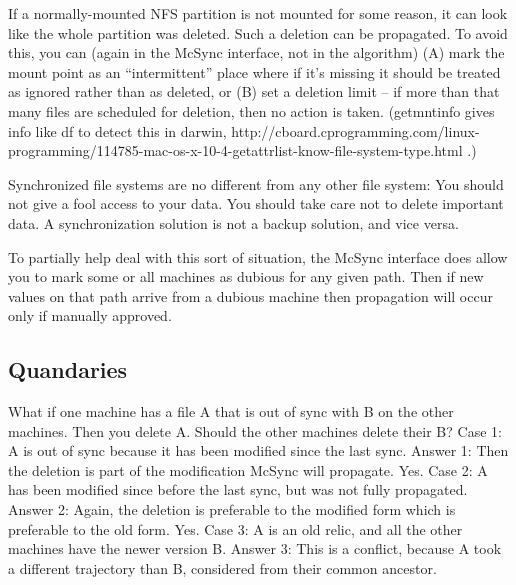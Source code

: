 \documentclass{book}
\begin{document}
If a normally-mounted NFS partition is not mounted for some reason, it can look like the whole partition was deleted.  Such a deletion can be propagated.  To avoid this, you can (again in the McSync interface, not in the algorithm) (A) mark the mount point as an ``intermittent'' place where if it's missing it should be treated as ignored rather than as deleted, or (B) set a deletion limit -- if more than that many files are scheduled for deletion, then no action is taken.  (getmntinfo gives info like df to detect this in darwin, http://cboard.cprogramming.com/linux-programming/114785-mac-os-x-10-4-getattrlist-know-file-system-type.html .)

Synchronized file systems are no different from any other file system:  You should not give a fool access to your data.  You should take care not to delete important data.  A synchronization solution is not a backup solution, and vice versa.

To partially help deal with this sort of situation, the McSync interface does allow you to mark some or all machines as dubious for any given path.  Then if new values on that path arrive from a dubious machine then propagation will occur only if manually approved.





\subsection{Quandaries}

What if one machine has a file A that is out of sync with B on the other machines.  Then you delete A.  Should the other machines delete their B?
Case 1: A is out of sync because it has been modified since the last sync.
Answer 1: Then the deletion is part of the modification McSync will propagate.  Yes.
Case 2: A has been modified since before the last sync, but was not fully propagated.
Answer 2: Again, the deletion is preferable to the modified form which is preferable to the old form.  Yes.
Case 3: A is an old relic, and all the other machines have the newer version B.
Answer 3: This is a conflict, because A took a different trajectory than B, considered from their common ancestor.
\end{document}
